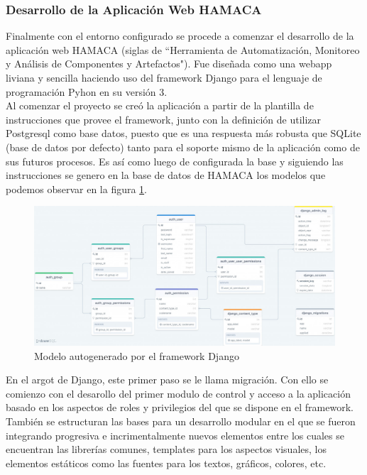 \subsubsection{Desarrollo de la Aplicación Web HAMACA}
Finalmente con el entorno configurado se procede a comenzar el desarrollo de la aplicación web HAMACA (siglas de ``Herramienta de Automatización, Monitoreo y Análisis de Componentes y Artefactos"). Fue diseñada como una webapp liviana y sencilla haciendo uso del framework Django para el lenguaje de programación Pyhon en su versión 3.\\

Al comenzar el proyecto se creó la aplicación a partir de la plantilla de instrucciones que provee el framework, junto con la definición de utilizar Postgresql como base datos, puesto que es una respuesta más robusta que SQLite (base de datos por defecto) tanto para el soporte mismo de la aplicación como de sus futuros procesos. Es así como luego de configurada la base y siguiendo las instrucciones se genero en la base de datos de HAMACA los modelos que podemos observar en la figura \ref{fig:django_schema}.
\begin{figure}[!htb]
\centering
\includegraphics[scale=0.28]{./Figuras/django_schema.jpg}
\caption{Modelo autogenerado por el framework Django}
\label{fig:django_schema}
\vspace*{-10pt}
\end{figure}

En el argot de Django, este primer paso se le llama migración. Con ello se comienzo con el desarollo del primer modulo de control y acceso a la aplicación basado en los aspectos de roles y privilegios del que se dispone en el framework. También se estructuran las bases para un desarrollo modular en el que se fueron integrando progresiva e incrimentalmente nuevos elementos entre los cuales se encuentran las librerías comunes, templates para los aspectos visuales, los elementos estáticos como las fuentes para los textos, gráficos, colores, etc.\\


